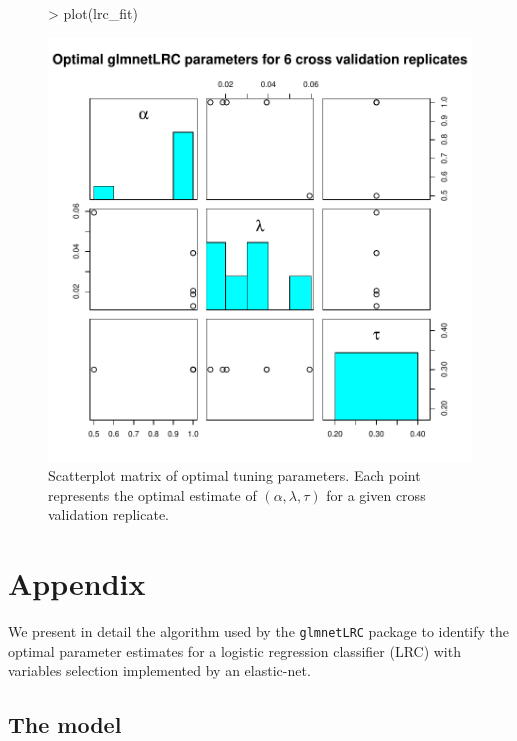 \documentclass{article}
\begin{document}
\begin{figure}[H]
\begin{center}
\begin{Schunk}
\begin{Sinput}
> plot(lrc_fit)
\end{Sinput}
\end{Schunk}
\includegraphics{glmnetLRC-plot}
\caption{Scatterplot matrix of optimal tuning parameters.  Each point represents the optimal estimate of $(\alpha,\lambda,\tau)$
for a given cross validation replicate.}
\end{center}
\end{figure}




\newpage

\section{Appendix}
We present in detail the algorithm used by the {\tt glmnetLRC} package to identify the optimal parameter estimates
for a logistic regression classifier (LRC) with variables selection implemented by an elastic-net.  

\subsection{The model}
\end{document}
